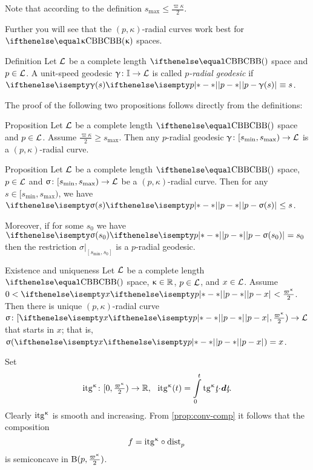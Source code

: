 Note that according to the definition $s_{\max}\le\tfrac{\varpi\kappa}2$.

Further you will see that the $(p,\kappa)$-radial curves 
work best for $\Alex\kappa$ spaces.



\begin{thm}{Definition}\label{def:rad-geod}
Let $\mathcal{L}$ be a complete length $\Alex{}$ space
and $p\in\spc{L}$.
A unit-speed geodesic  $\gamma\:\II\to \spc{L}$  is called 
\emph{$p$-radial geodesic} if 
$\dist{p}{\gamma(s)}{}\equiv s$.
\end{thm}

The proof of the following two propositions follows directly from the definitions: 

\begin{thm}{Proposition}\label{prop:rad-geod}
Let $\mathcal{L}$ be a complete length $\Alex{}$ space
and $p\in\spc{L}$.
Assume $\tfrac{\varpi\kappa}{2}
\ge 
s_{\max}$.
Then any $p$-radial geodesic 
$\gamma\:[s_{\min},s_{\max})
\to 
\spc{L}$ 
is a $(p,\kappa)$-radial curve.
\end{thm}

\begin{thm}{Proposition}\label{prop:dist<s}
Let $\mathcal{L}$ be a complete length $\Alex{}$ space, 
$p\in\spc{L}$ 
and $\sigma\:[s_{\min},s_{\max})\to \spc{L}$ be a $(p,\kappa)$-radial curve.
Then for any $s\in [s_{\min},s_{\max})$, 
we have $\dist{p}{\sigma(s)}{}\le s$.

Moreover, 
if for some $s_0$ we have $\dist{p}{\sigma(s_0)}{}= s_0$ 
then the restriction $\sigma|_{[s_{\min},s_0]}$ is a $p$-radial geodesic.
\end{thm}

\begin{thm}{Existence and uniqueness}\label{rad-curv-exist}
Let $\mathcal{L}$ be a complete length $\Alex{}$ space, 
$\kappa\in\RR$, 
$p\in\spc{L}$, 
and $x\in \spc{L}$.
Assume
$0
<
\dist{p}{x}{}
<
\tfrac{\varpi\kappa}2$.
Then there is unique $(p,\kappa)$-radial curve $\sigma\:[\dist{p}{x}{},\tfrac{\varpi\kappa}2)\to \spc{L}$ 
that starts in $x$;
that is, $\sigma(\dist{p}{x}{})=x$.
\end{thm}


Set\index{$\itg\kappa$} 
\[\itg\kappa\:[0,\tfrac{\varpi\kappa}2)\to\RR,
\ \ 
\itg\kappa (t)=\int\limits_0^t\tg\kappa\under t\cdot\dd\under t.\]
Clearly $\itg\kappa$ is smooth and increasing.
From \ref{prop:conv-comp} it follows that the composition 
\[f=\itg\kappa\circ\distfun{p}{}{}\] 
is semiconcave in $\oBall(p,\tfrac{\varpi\kappa}2)$.

